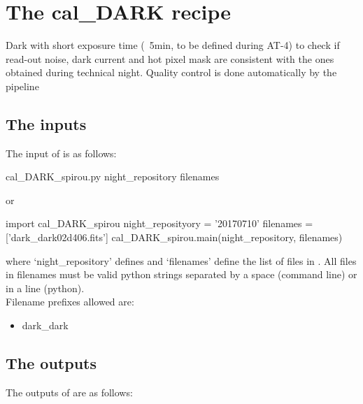 \clearpage
\newpage
\fi










\section{The cal\_DARK recipe}
\label{ch:the_recipes:cal_DARK_spirou}

Dark with short exposure time (~5min, to be defined during AT-4) to check if read-out noise, dark current and hot pixel mask are consistent with the ones obtained during technical night. Quality control is done automatically by the pipeline \\


\subsection{The inputs}
The input of \calDARK is as follows:
\begin{cmdbox}
cal_DARK_spirou.py  night_repository  filenames
\end{cmdbox}
\noindent or
\begin{pythonbox}
import cal_DARK_spirou
night_reposityory = '20170710'
filenames = ['dark_dark02d406.fits']
cal_DARK_spirou.main(night_repository, filenames)
\end{pythonbox}

\noindent where `night\_repository' defines \argnightname and `filenames' define the list of files in \argfilenames. All files in filenames must be valid python strings separated by a space (command line) or in a line (python). \\

\noindent Filename prefixes allowed are:
\begin{itemize}
	\item dark\_dark
\end{itemize}

\subsection{The outputs}
The outputs of \calDARK are as follows:

